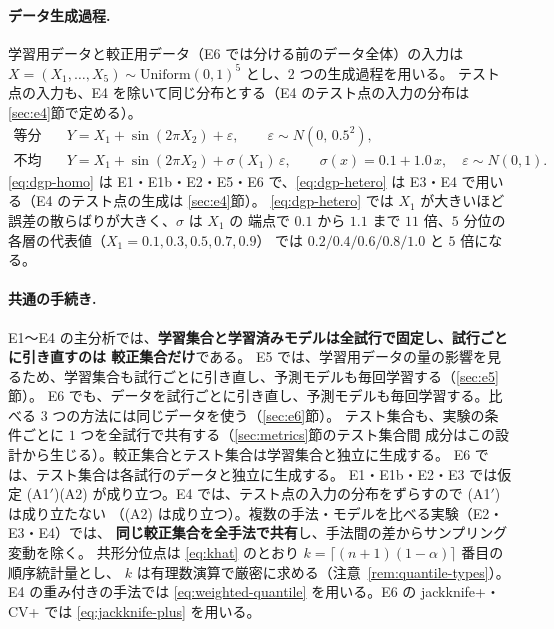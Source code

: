 \documentclass[a4paper,11pt]{jsarticle}
\theoremstyle{definition}
\theoremstyle{plain}
\theoremstyle{remark}
\begin{document}
\paragraph{データ生成過程.}
学習用データと較正用データ（E6 では分ける前のデータ全体）の入力は $X=(X_1,\dots,X_5)\sim\mathrm{Uniform}(0,1)^5$ とし、$2$ つの生成過程を用いる。
テスト点の入力も、E4 を除いて同じ分布とする（E4 のテスト点の入力の分布は \ref{sec:e4}節で定める）。
\begin{align}
  \text{等分散：}&\quad Y=X_1+\sin(2\pi X_2)+\varepsilon,\qquad \varepsilon\sim N(0,\,0.5^2), \label{eq:dgp-homo}\\
  \text{不均一分散：}&\quad Y=X_1+\sin(2\pi X_2)+\sigma(X_1)\,\varepsilon,\qquad
  \sigma(x)=0.1+1.0\,x,\quad \varepsilon\sim N(0,1). \label{eq:dgp-hetero}
\end{align}
\eqref{eq:dgp-homo} は E1・E1b・E2・E5・E6 で、\eqref{eq:dgp-hetero} は E3・E4 で用いる（E4 のテスト点の生成は \ref{sec:e4}節）。
\eqref{eq:dgp-hetero} では $X_1$ が大きいほど誤差の散らばりが大きく、$\sigma$ は $X_1$ の
端点で $0.1$ から $1.1$ まで $11$ 倍、$5$ 分位の各層の代表値（$X_1=0.1,0.3,0.5,0.7,0.9$）
では $0.2/0.4/0.6/0.8/1.0$ と $5$ 倍になる。

\paragraph{共通の手続き.}
E1〜E4 の主分析では、\textbf{学習集合と学習済みモデルは全試行で固定し、試行ごとに引き直すのは
較正集合だけ}である。
E5 では、学習用データの量の影響を見るため、学習集合も試行ごとに引き直し、予測モデルも毎回学習する（\ref{sec:e5}節）。
E6 でも、データを試行ごとに引き直し、予測モデルも毎回学習する。比べる $3$ つの方法には同じデータを使う（\ref{sec:e6}節）。
テスト集合も、実験の条件ごとに $1$ つを全試行で共有する（\ref{sec:metrics}節のテスト集合間
成分はこの設計から生じる）。較正集合とテスト集合は学習集合と独立に生成する。
E6 では、テスト集合は各試行のデータと独立に生成する。
E1・E1b・E2・E3 では仮定 (A1$'$)(A2) が成り立つ。E4 では、テスト点の入力の分布をずらすので (A1$'$) は成り立たない
（(A2) は成り立つ）。複数の手法・モデルを比べる実験（E2・E3・E4）では、
\textbf{同じ較正集合を全手法で共有}し、手法間の差からサンプリング変動を除く。
共形分位点は \eqref{eq:khat} のとおり $k=\lceil(n+1)(1-\alpha)\rceil$ 番目の順序統計量とし、
$k$ は有理数演算で厳密に求める（注意~\ref{rem:quantile-types}）。E4 の重み付きの手法では
\eqref{eq:weighted-quantile} を用いる。E6 の jackknife+・CV+ では \eqref{eq:jackknife-plus} を用いる。
\end{document}
